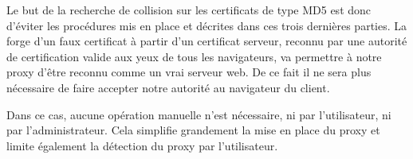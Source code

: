 Le but de la recherche de collision sur les certificats de type MD5 est donc d'éviter les
procédures mis en place et décrites dans ces trois dernières parties. La forge d'un faux 
certificat à partir d'un certificat serveur, reconnu par une autorité de 
certification valide aux yeux de tous les navigateurs, va permettre à notre 
proxy d'être reconnu comme un vrai serveur web. De ce fait il ne sera plus 
nécessaire de faire accepter notre autorité au navigateur du client.

Dans ce cas, aucune opération manuelle n'est nécessaire, ni par l'utilisateur, ni par l'administrateur.
Cela simplifie grandement la mise en place du proxy et limite également la
détection du proxy par l'utilisateur.

